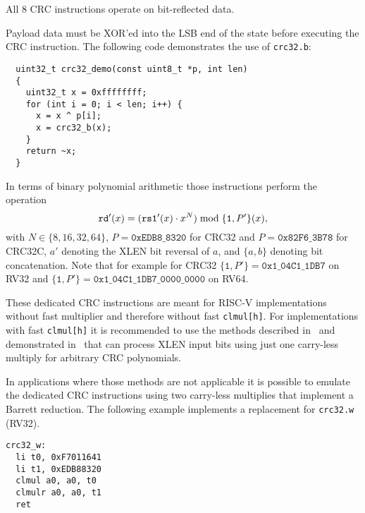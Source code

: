 All 8 CRC instructions operate on bit-reflected data.



Payload data must be XOR'ed into the LSB end of the state before executing the
CRC instruction. The following code demonstrates the use of \texttt{crc32.b}:

\begin{minipage}{\linewidth}
\begin{verbatim}
  uint32_t crc32_demo(const uint8_t *p, int len)
  {
    uint32_t x = 0xffffffff;
    for (int i = 0; i < len; i++) {
      x = x ^ p[i];
      x = crc32_b(x);
    }
    return ~x;
  }
\end{verbatim}
\end{minipage}

In terms of binary polynomial arithmetic those instructions perform the operation
$$ \texttt{rd}'(x) = (\texttt{rs1}'(x) \cdot x^N) \; \textrm{mod} \; \{\texttt{1}, P'\}(x)\textrm, $$
with $N \in \{8, 16, 32, 64\}$,
$P = \texttt{0xEDB8\_8320}$ for CRC32 and $P = \texttt{0x82F6\_3B78}$ for CRC32C,
$a'$ denoting the XLEN bit reversal of $a$,
and $\{a, b\}$ denoting bit concatenation.
Note that for example for CRC32 $\{\texttt{1}, P'\} = \texttt{0x1\_04C1\_1DB7}$
on RV32 and $\{\texttt{1}, P'\} = \texttt{0x1\_04C1\_1DB7\_0000\_0000}$ on RV64.

These dedicated CRC instructions are meant for RISC-V implementations without fast multiplier
and therefore without fast \texttt{clmul[h]}. For implementations with fast \texttt{clmul[h]}
it is recommended to use the methods described in~\cite{FastCRC} and demonstrated in~\cite{Wolf18A}
that can process XLEN input bits using just one carry-less multiply for arbitrary CRC polynomials.

In applications where those methods are not applicable it is possible to emulate the dedicated CRC
instructions using two carry-less multiplies that implement a Barrett reduction. The following example
implements a replacement for \texttt{crc32.w} (RV32).

\begin{minipage}{\linewidth}
\begin{verbatim}
crc32_w:
  li t0, 0xF7011641
  li t1, 0xEDB88320
  clmul a0, a0, t0
  clmulr a0, a0, t1
  ret
\end{verbatim}
\end{minipage}


